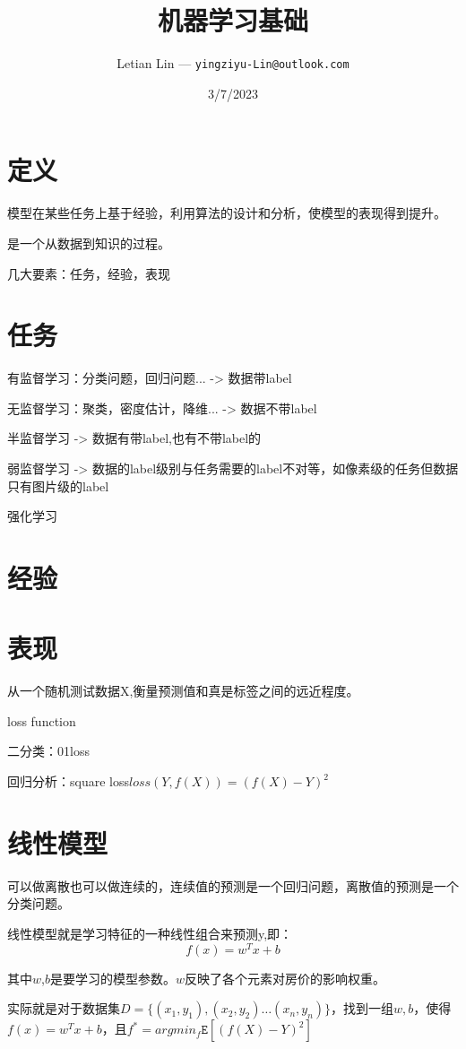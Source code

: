 \documentclass[UTF8]{ctexart}
\title{
	机器学习基础
}
\author{
	Letian Lin --- \texttt{yingziyu-Lin@outlook.com}
}
\date{3/7/2023}
\begin{document}
\maketitle

\section{定义}
模型在某些任务上基于经验，利用算法的设计和分析，使模型的表现得到提升。

是一个从数据到知识的过程。

几大要素：任务，经验，表现

\section{任务}
有监督学习：分类问题，回归问题... -> 数据带label

无监督学习：聚类，密度估计，降维... -> 数据不带label

半监督学习 -> 数据有带label,也有不带label的

弱监督学习 -> 数据的label级别与任务需要的label不对等，如像素级的任务但数据只有图片级的label

强化学习

\section{经验}

\section{表现}
从一个随机测试数据X,衡量预测值和真是标签之间的远近程度。

loss function

二分类：01loss

回归分析：square loss$loss(Y,f(X))=(f(X) - Y)^2$

\section{线性模型}
可以做离散也可以做连续的，连续值的预测是一个回归问题，离散值的预测是一个分类问题。

线性模型就是学习特征的一种线性组合来预测y,即：$$f(x)=w^Tx+b$$

其中$w$,$b$是要学习的模型参数。$w$反映了各个元素对房价的影响权重。

实际就是对于数据集$D=\{(x_1,y_1),(x_2,y_2)\dots (x_n,y_n)\}$，找到一组$w,b$，使得$f(x)=w^Tx+b$，且$f^*=argmin_f \mathtt{E}[(f(X)-Y)^2]$
\end{document}
